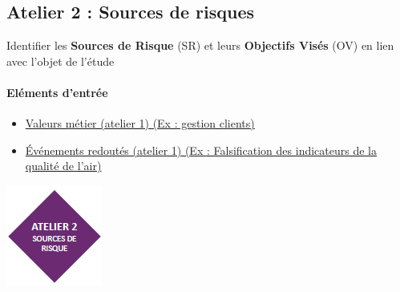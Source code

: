 \documentclass[french, 12pt]{article}%
\newcommand{\itemE}{\item[$\bullet$]}
\newcommand{\titreencadre}{Titre}
\newenvironment{encadre}[1]{\renewcommand{\titreencadre}{#1}
	\begin{mdframed}[style=encadrestyle]
	\vspace{0.5\baselineskip}
	}{%
	\end{mdframed}}
\begin{document}
\subsection{Atelier 2 : Sources de risques}
\begin{encadre}{Objectif}
Identifier les \textbf{Sources de Risque} (SR) et leurs \textbf{Objectifs Visés} (OV) en lien avec l’objet de l’étude
\end{encadre}

\begin{minipage}[c]{0.6\linewidth}
\paragraph{Eléments d'entrée}
\begin{itemize}
\itemE \href{run:./ressource_eleve/Atelier1/A1_documents.ods}{Valeurs métier (atelier 1) (Ex : gestion clients)}
\itemE \href{run:./ressource_eleve/Atelier1/A1_documents.ods}{Événements redoutés (atelier 1) (Ex : Falsification des indicateurs de la qualité de l'air)}
\end{itemize}
\end{minipage}
\begin{minipage}[c]{0.4\linewidth}
\begin{center}
\includegraphics[scale=0.8]{./ressource/logoA2.png}
\end{center}
\end{minipage}
\end{document}
